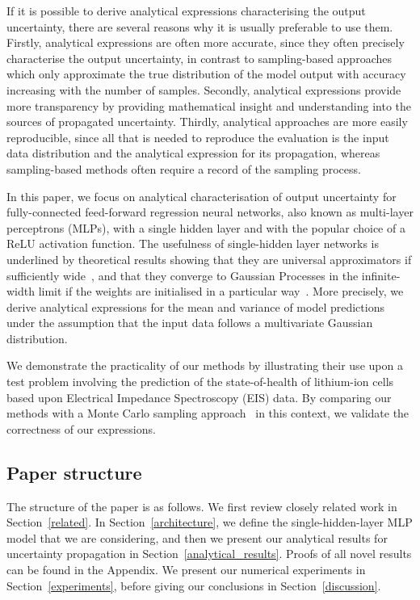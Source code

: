 \documentclass{article}
\begin{document}
If it is possible to derive analytical expressions characterising the output uncertainty, there are several reasons why it is usually preferable to use them. Firstly, analytical expressions are often more accurate, since they often precisely characterise the output uncertainty, in contrast to sampling-based approaches which only approximate the true distribution of the model output with accuracy increasing with the number of samples. Secondly, analytical expressions provide more transparency by providing mathematical insight and understanding into the sources of propagated uncertainty. Thirdly, analytical approaches are more easily reproducible, since all that is needed to reproduce the evaluation is the input data distribution and the analytical expression for its propagation, whereas sampling-based methods often require a record of the sampling process. 

In this paper, we focus on analytical characterisation of output uncertainty for fully-connected feed-forward regression neural networks, also known as multi-layer perceptrons (MLPs), with a single hidden layer and with the popular choice of a ReLU activation function. The usefulness of single-hidden layer networks is underlined by theoretical results showing that they are universal approximators if sufficiently wide~\cite{hornik1989multilayer}, and that they converge to Gaussian Processes in the infinite-width limit if the weights are initialised in a particular way~\cite{neal1996priors}. More precisely, we derive analytical expressions for the mean and variance of model predictions under the assumption that the input data follows a multivariate Gaussian distribution. 

We demonstrate the practicality of our methods by illustrating their use upon a test problem involving the prediction of the state-of-health of lithium-ion cells based upon Electrical Impedance Spectroscopy (EIS) data. By comparing our methods with a Monte Carlo sampling approach~\cite{bipm2008supplement} in this context, we validate the correctness of our expressions.

\subsection{Paper structure}

The structure of the paper is as follows. We first review closely related work in Section~\ref{related}. In Section~\ref{architecture}, we define the single-hidden-layer MLP model that we are considering, and then we present our analytical results for uncertainty propagation in Section~\ref{analytical_results}. Proofs of all novel results can be found in the Appendix. We present our numerical experiments in Section~\ref{experiments}, before giving our conclusions in Section~\ref{discussion}.
\end{document}
